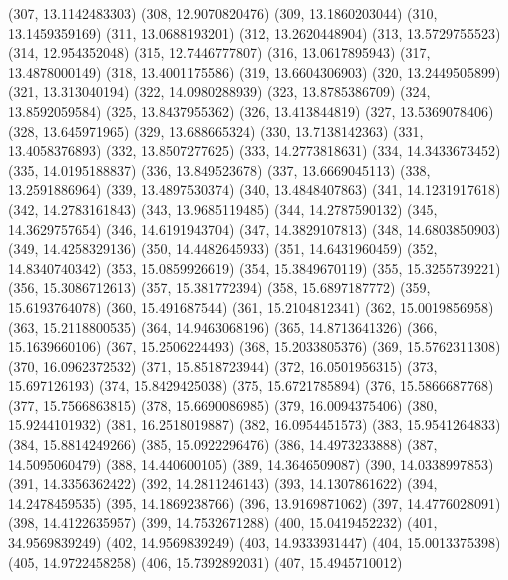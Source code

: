 {					(307, 13.1142483303)
					(308, 12.9070820476)
					(309, 13.1860203044)
					(310, 13.1459359169)
					(311, 13.0688193201)
					(312, 13.2620448904)
					(313, 13.5729755523)
					(314, 12.954352048)
					(315, 12.7446777807)
					(316, 13.0617895943)
					(317, 13.4878000149)
					(318, 13.4001175586)
					(319, 13.6604306903)
					(320, 13.2449505899)
					(321, 13.313040194)
					(322, 14.0980288939)
					(323, 13.8785386709)
					(324, 13.8592059584)
					(325, 13.8437955362)
					(326, 13.413844819)
					(327, 13.5369078406)
					(328, 13.645971965)
					(329, 13.688665324)
					(330, 13.7138142363)
					(331, 13.4058376893)
					(332, 13.8507277625)
					(333, 14.2773818631)
					(334, 14.3433673452)
					(335, 14.0195188837)
					(336, 13.849523678)
					(337, 13.6669045113)
					(338, 13.2591886964)
					(339, 13.4897530374)
					(340, 13.4848407863)
					(341, 14.1231917618)
					(342, 14.2783161843)
					(343, 13.9685119485)
					(344, 14.2787590132)
					(345, 14.3629757654)
					(346, 14.6191943704)
					(347, 14.3829107813)
					(348, 14.6803850903)
					(349, 14.4258329136)
					(350, 14.4482645933)
					(351, 14.6431960459)
					(352, 14.8340740342)
					(353, 15.0859926619)
					(354, 15.3849670119)
					(355, 15.3255739221)
					(356, 15.3086712613)
					(357, 15.381772394)
					(358, 15.6897187772)
					(359, 15.6193764078)
					(360, 15.491687544)
					(361, 15.2104812341)
					(362, 15.0019856958)
					(363, 15.2118800535)
					(364, 14.9463068196)
					(365, 14.8713641326)
					(366, 15.1639660106)
					(367, 15.2506224493)
					(368, 15.2033805376)
					(369, 15.5762311308)
					(370, 16.0962372532)
					(371, 15.8518723944)
					(372, 16.0501956315)
					(373, 15.697126193)
					(374, 15.8429425038)
					(375, 15.6721785894)
					(376, 15.5866687768)
					(377, 15.7566863815)
					(378, 15.6690086985)
					(379, 16.0094375406)
					(380, 15.9244101932)
					(381, 16.2518019887)
					(382, 16.0954451573)
					(383, 15.9541264833)
					(384, 15.8814249266)
					(385, 15.0922296476)
					(386, 14.4973233888)
					(387, 14.5095060479)
					(388, 14.440600105)
					(389, 14.3646509087)
					(390, 14.0338997853)
					(391, 14.3356362422)
					(392, 14.2811246143)
					(393, 14.1307861622)
					(394, 14.2478459535)
					(395, 14.1869238766)
					(396, 13.9169871062)
					(397, 14.4776028091)
					(398, 14.4122635957)
					(399, 14.7532671288)
					(400, 15.0419452232)
					(401, 34.9569839249)
					(402, 14.9569839249)
					(403, 14.9333931447)
					(404, 15.0013375398)
					(405, 14.9722458258)
					(406, 15.7392892031)
					(407, 15.4945710012)
}
